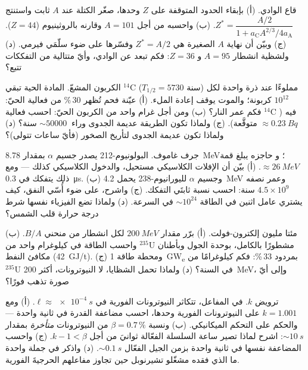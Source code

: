 \begin{exercise}[$\star\star$]\label{exo:b3:nuclear-physics:6}
قاع الوادي. (أ) بإبقاء الحدود المتوقفة على $Z$ وحدها،
صغّر الكتلة عند $A$ ثابت واستنتج
$Z^* = \dfrac{A/2}{1 + a_{\text{C}}A^{2/3}/4a_{\text{A}}}$. (ب)
واحسبه من أجل $A = 101$ وقارنه بالروثينيوم ($Z = 44$).
(ج) وبيّن أن نهاية $A$ الصغيرة هي $Z^* = A/2$ وفسّرها على ضوء
سلّمَي فيرمي. (د) ولشظية انشطار $A = 95$ و
$Z = 36$: فكم تبعد عن الوادي، وأيّ متتالية من
التفككات تتبع؟
\end{exercise}

\begin{exercise}[$\star\star$]\label{exo:b3:nuclear-physics:7}
الكربون المشعّ. المادة الحية تبقي $^{14}$C
($T_{1/2} = 5730$ سنة) مملوءًا عند ذرة واحدة لكل $10^{12}$
كربونة؛ والموت يوقف إعادة الملء. (أ) عيّنة فحم تُظهر
30\,\% من فعالية الحيّ: فكم عمر النار؟ (ب) ومن أجل غرام واحد
من الكربون الحيّ: احسب فعالية $^{14}$C فيه
($\approx\qty{0.23}{Bq}$ متوقَّعة). (ج) ولماذا تكون الطريقة عديمة الجدوى
وراء $\sim\qty{50000}{}$ سنة؟ (د) ولماذا تكون عديمة الجدوى
لتأريخ الصخور (فأيّ ساعات تتولى)؟
\end{exercise}

\begin{exercise}[$\star\star$]\label{exo:b3:nuclear-physics:8}
جرف غاموف. البولونيوم-212 يصدر جسيم $\alpha$ بمقدار \qty{8.78}{MeV}؛ و
حاجزه يبلغ قمة $\approx\qty{26}{MeV}$. (أ) بيّن أن الإفلات
الكلاسيكي مستحيل، والدخول الكلاسيكي كذلك --- ومع ذلك يتفكك
في \qty{0.3}{\micro s}. (ب) وجسيم $\alpha$ لليورانيوم-238 يحمل
\qty{4.2}{MeV} وعمر نصفه $4.5\times10^9$ سنة:
احسب نسبة ثابتَي التفكك. (ج) واشرح، على ضوء
أُسّي النفق، كيف يشتري عامل اثنين في الطاقة
$\sim10^{24}$ في السرعة. (د) ولماذا تضع الفيزياء نفسها شرط
درجة حرارة قلب الشمس؟
\end{exercise}

\begin{exercise}[$\star\star$]\label{exo:b3:nuclear-physics:9}
مئتا مليون إلكترون-فولت. (أ) برّر مقدار
$\qty{200}{MeV}$ لكل انشطار من منحني $B/A$. (ب) واحسب
الطاقة في كيلوغرام واحد من $^{235}$U مشطورًا بالكامل، بوحدة
الجول وبأطنان مكافئ النفط
(\qty{42}{GJ/t}). (ج) ومحطة طاقة \qty{1}{GW_e} بمردود 33\,\%:
فكم كيلوغرامًا من $^{235}$U في السنة؟ (د) ولماذا تحمل
الشظايا، لا النيوترونات، أكثر
\qty{200}{MeV}، وإلى أيّ صورة تذهب فورًا؟
\end{exercise}

\begin{exercise}[$\star\star\star$]\label{exo:b3:nuclear-physics:10}
ترويض $k$. في المفاعل، تتكاثر النيوترونات الفورية في $\ell
\approx \qty{e-4}{s}$. (أ) ومع $k = 1.001$ على النيوترونات الفورية
وحدها، احسب مضاعفة القدرة في ثانية واحدة --- والحكم
على التحكم الميكانيكي. (ب) ونسبة $\beta =
0.7\,\%$ من النيوترونات \emph{متأخرة} بمقدار $\sim\qty{10}{s}$:
اشرح لماذا تصير ساعة السلسلة الفعّالة ثوانيَ من أجل $k - 1 < \beta$. (ج) واحسب المضاعفة نفسها في ثانية واحدة
بزمن الجيل الفعّال $\sim\qty{0.1}{s}$. (د) واذكر
في جملة واحدة ما الذي فقده مشغّلو تشيرنوبل حين تجاوز
مفاعلهم الحرجيةَ الفورية.
\end{exercise}

